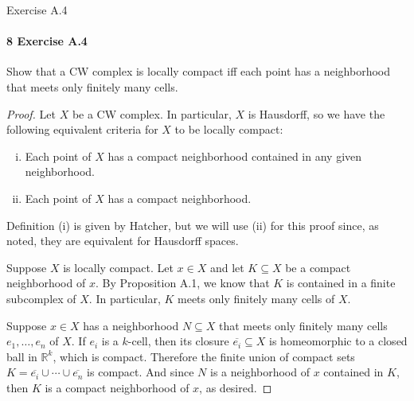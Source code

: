 \documentclass[12pt]{article}
\newlength{\myparskip}
\newenvironment{fullbox}{\begin{lrbox}{\savefullbox}\begin{minipage}{\dimexpr\textwidth-2\fboxsep\relax}\setlength{\parskip}{\myparskip}}{\end{minipage}\end{lrbox}\framebox[\textwidth]{\usebox{\savefullbox}}}
\newenvironment{pbox}[1][]{\begin{fullbox}\ifx#1\empty\else\paragraph{#1}\phantom{}\fi}{\end{fullbox}}
\theoremstyle{definition}
\newcommand{\R}{\mathbb{R}}
\newcommand{\<}{\langle}
\renewcommand{\>}{\rangle}
\newcommand{\clo}{\overline}
\newcommand{\seq}{\subseteq}
\begin{document}
\newpage
\begin{pbox}[8 Exercise A.4]
    Show that a CW complex is locally compact iff each point has a neighborhood that meets only finitely many cells.
\end{pbox}

\begin{proof}
    Let $X$ be a CW complex.
    In particular, $X$ is Hausdorff, so we have the following equivalent criteria for $X$ to be locally compact:
    \begin{enumerate}[(i)]
        \item Each point of $X$ has a compact neighborhood contained in any given neighborhood.
        \item Each point of $X$ has a compact neighborhood.
    \end{enumerate}
    Definition (i) is given by Hatcher, but we will use (ii) for this proof since, as noted, they are equivalent for Hausdorff spaces.

    Suppose $X$ is locally compact.
    Let $x \in X$ and let $K \seq X$ be a compact neighborhood of $x$.
    By Proposition A.1, we know that $K$ is contained in a finite subcomplex of $X$.
    In particular, $K$ meets only finitely many cells of $X$.

    Suppose $x \in X$ has a neighborhood $N \seq X$ that meets only finitely many cells $e_1, \dots, e_n$ of $X$.
    If $e_i$ is a $k$-cell, then its closure $\clo{e_i} \seq X$ is homeomorphic to a closed ball in $\R^k$, which is compact.
    Therefore the finite union of compact sets $K = \clo{e_i} \cup \cdots \cup \clo{e_n}$ is compact.
    And since $N$ is a neighborhood of $x$ contained in $K$, then $K$ is a compact neighborhood of $x$, as desired.
\end{proof}
\end{document}
